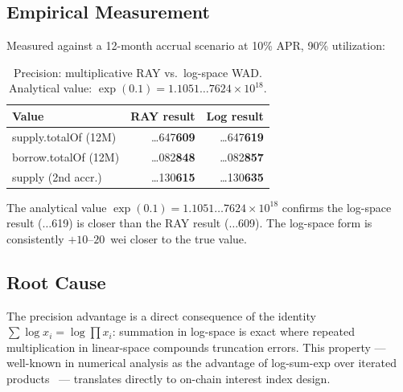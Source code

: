 \documentclass[10pt,a4paper,twocolumn]{article}
\theoremstyle{definition}
\theoremstyle{plain}
\theoremstyle{remark}
\begin{document}
\subsection{Empirical Measurement}
\label{subsec:precision-empirical}

Measured against a 12-month accrual scenario at 10\% APR, 90\% utilization:

\begin{table}[htbp]
\centering
\caption{Precision: multiplicative RAY vs.\ log-space WAD. Analytical value: $\exp(0.1) = 1.1051{\ldots}7624 \times 10^{18}$.}
\label{tab:precision}
\small
\begin{tabular*}{0.95\columnwidth}{@{\extracolsep{\fill}}lrr@{}}
\toprule
Value & RAY result & Log result \\
\midrule
supply.totalOf (12M) & \ldots647\textbf{609} & \ldots647\textbf{619} \\
borrow.totalOf (12M) & \ldots082\textbf{848} & \ldots082\textbf{857} \\
supply (2nd accr.) & \ldots130\textbf{615} & \ldots130\textbf{635} \\
\bottomrule
\end{tabular*}
\end{table}

The analytical value $\exp(0.1) = 1.1051{\ldots}7624 \times 10^{18}$ confirms the log-space result ($\ldots$619) is closer than the RAY result ($\ldots$609). The log-space form is consistently $+10$--$20$~wei closer to the true value.

\subsection{Root Cause}
\label{subsec:precision-root}

The precision advantage is a direct consequence of the identity $\sum \log x_i = \log \prod x_i$: summation in log-space is exact where repeated multiplication in linear-space compounds truncation errors. This property --- well-known in numerical analysis as the advantage of log-sum-exp over iterated products~\cite{higham2002} --- translates directly to on-chain interest index design.
\end{document}
